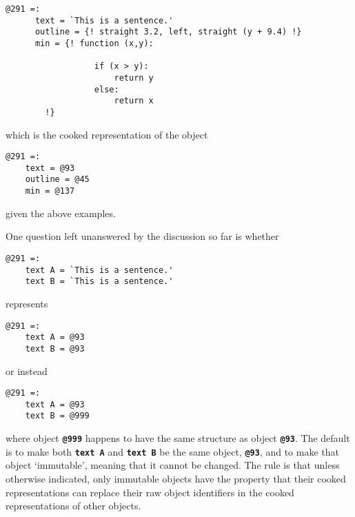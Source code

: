 \documentclass[12pt]{article}
\newcommand{\TT}[1]{{\tt \bfseries #1}}
\newenvironment{indpar}[1][0.3in]%
	{\begin{list}{}%
		     {\setlength{\itemsep}{0in}%
		      \setlength{\topsep}{0in}%
		      \setlength{\parsep}{1ex}%
		      \setlength{\labelwidth}{#1}%
		      \setlength{\leftmargin}{#1}%
		      \addtolength{\leftmargin}{\labelsep}}%
	 \item}%
	{\end{list}}
\begin{document}
\begin{indpar}\begin{verbatim}
@291 =:
      text = `This is a sentence.'
      outline = {! straight 3.2, left, straight (y + 9.4) !}
      min = {! function (x,y):

                  if (x > y):
                      return y
                  else:
                      return x
	    !}
\end{verbatim}\end{indpar}

which is the cooked representation of the object

\begin{indpar}\begin{verbatim}
@291 =:
    text = @93
    outline = @45
    min = @137
\end{verbatim}\end{indpar}

given the above examples.

One question left unanswered by the discussion so far is whether

\begin{indpar}\begin{verbatim}
@291 =:
    text A = `This is a sentence.'
    text B = `This is a sentence.'
\end{verbatim}\end{indpar}

represents

\begin{indpar}\begin{verbatim}
@291 =:
    text A = @93
    text B = @93
\end{verbatim}\end{indpar}

or instead

\begin{indpar}\begin{verbatim}
@291 =:
    text A = @93
    text B = @999
\end{verbatim}\end{indpar}

where object \TT{@999} happens to have the same structure as
object \TT{@93}.  The default is to make both \TT{text A}
and \TT{text B} be the same object, \TT{@93}, and to make
that object `immutable', meaning that it cannot be changed.  The
rule is that unless otherwise indicated, only immutable objects
have the property that their cooked representations can replace
their raw object identifiers in the cooked representations of other
objects.
\end{document}
